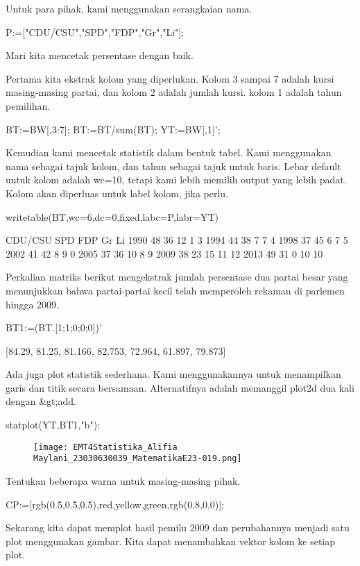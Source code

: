 \documentclass{article}
\begin{document}
Untuk para pihak, kami menggunakan serangkaian nama.


\>P:=["CDU/CSU","SPD","FDP","Gr","Li"];


Mari kita mencetak persentase dengan baik.


Pertama kita ekstrak kolom yang diperlukan. Kolom 3 sampai 7 adalah
kursi masing-masing partai, dan kolom 2 adalah jumlah kursi. kolom 1
adalah tahun pemilihan.


\>BT:=BW[,3:7]; BT:=BT/sum(BT); YT:=BW[,1]';


Kemudian kami mencetak statistik dalam bentuk tabel. Kami menggunakan
nama sebagai tajuk kolom, dan tahun sebagai tajuk untuk baris. Lebar
default untuk kolom adalah wc=10, tetapi kami lebih memilih output
yang lebih padat. Kolom akan diperluas untuk label kolom, jika perlu.


\>writetable(BT,wc=6,dc=0,\>fixed,labc=P,labr=YT)


           CDU/CSU   SPD   FDP    Gr    Li
      1990      48    36    12     1     3
      1994      44    38     7     7     4
      1998      37    45     6     7     5
      2002      41    42     8     9     0
      2005      37    36    10     8     9
      2009      38    23    15    11    12
      2013      49    31     0    10    10

Perkalian matriks berikut mengekstrak jumlah persentase dua partai
besar yang menunjukkan bahwa partai-partai kecil telah memperoleh
rekaman di parlemen hingga 2009.


\>BT1:=(BT.[1;1;0;0;0])'


    [84.29,  81.25,  81.166,  82.753,  72.964,  61.897,  79.873]

Ada juga plot statistik sederhana. Kami menggunakannya untuk
menampilkan garis dan titik secara bersamaan. Alternatifnya adalah
memanggil plot2d dua kali dengan &gt;add.


\>statplot(YT,BT1,"b"):


\begin{figure}
    \centering
    \texttt{[image: EMT4Statistika\_Alifia Maylani\_23030630039\_MatematikaE23-019.png]}
    \caption{}
    \label{fig:enter-label}
\end{figure}

Tentukan beberapa warna untuk masing-masing pihak.


\>CP:=[rgb(0.5,0.5,0.5),red,yellow,green,rgb(0.8,0,0)];


Sekarang kita dapat memplot hasil pemilu 2009 dan perubahannya menjadi
satu plot menggunakan gambar. Kita dapat menambahkan vektor kolom ke
setiap plot.
\end{document}
